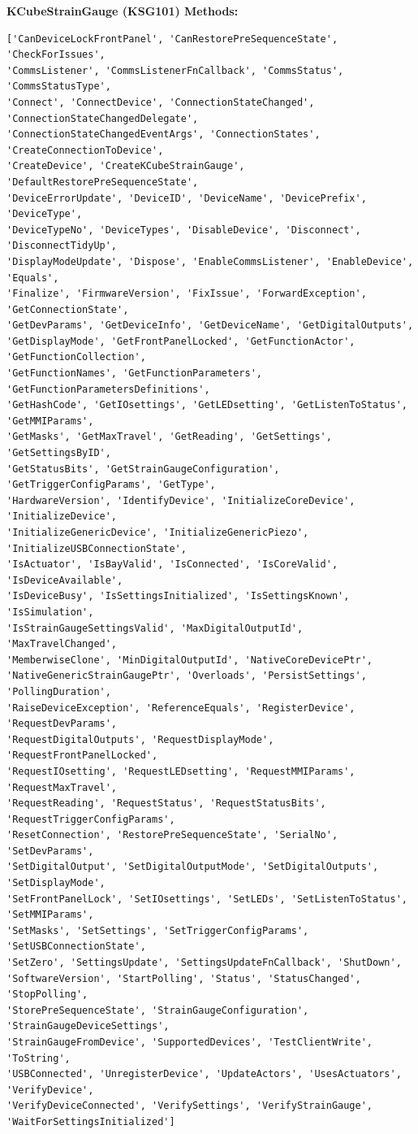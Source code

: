 \documentclass[12pt,a4paper]{article}
\begin{document}
\textbf{KCubeStrainGauge (KSG101) Methods:}
\begin{verbatim}
['CanDeviceLockFrontPanel', 'CanRestorePreSequenceState', 'CheckForIssues', 
'CommsListener', 'CommsListenerFnCallback', 'CommsStatus', 'CommsStatusType', 
'Connect', 'ConnectDevice', 'ConnectionStateChanged', 'ConnectionStateChangedDelegate', 
'ConnectionStateChangedEventArgs', 'ConnectionStates', 'CreateConnectionToDevice', 
'CreateDevice', 'CreateKCubeStrainGauge', 'DefaultRestorePreSequenceState', 
'DeviceErrorUpdate', 'DeviceID', 'DeviceName', 'DevicePrefix', 'DeviceType', 
'DeviceTypeNo', 'DeviceTypes', 'DisableDevice', 'Disconnect', 'DisconnectTidyUp', 
'DisplayModeUpdate', 'Dispose', 'EnableCommsListener', 'EnableDevice', 'Equals', 
'Finalize', 'FirmwareVersion', 'FixIssue', 'ForwardException', 'GetConnectionState', 
'GetDevParams', 'GetDeviceInfo', 'GetDeviceName', 'GetDigitalOutputs', 
'GetDisplayMode', 'GetFrontPanelLocked', 'GetFunctionActor', 'GetFunctionCollection', 
'GetFunctionNames', 'GetFunctionParameters', 'GetFunctionParametersDefinitions', 
'GetHashCode', 'GetIOsettings', 'GetLEDsetting', 'GetListenToStatus', 'GetMMIParams', 
'GetMasks', 'GetMaxTravel', 'GetReading', 'GetSettings', 'GetSettingsByID', 
'GetStatusBits', 'GetStrainGaugeConfiguration', 'GetTriggerConfigParams', 'GetType', 
'HardwareVersion', 'IdentifyDevice', 'InitializeCoreDevice', 'InitializeDevice', 
'InitializeGenericDevice', 'InitializeGenericPiezo', 'InitializeUSBConnectionState', 
'IsActuator', 'IsBayValid', 'IsConnected', 'IsCoreValid', 'IsDeviceAvailable', 
'IsDeviceBusy', 'IsSettingsInitialized', 'IsSettingsKnown', 'IsSimulation', 
'IsStrainGaugeSettingsValid', 'MaxDigitalOutputId', 'MaxTravelChanged', 
'MemberwiseClone', 'MinDigitalOutputId', 'NativeCoreDevicePtr', 
'NativeGenericStrainGaugePtr', 'Overloads', 'PersistSettings', 'PollingDuration', 
'RaiseDeviceException', 'ReferenceEquals', 'RegisterDevice', 'RequestDevParams', 
'RequestDigitalOutputs', 'RequestDisplayMode', 'RequestFrontPanelLocked', 
'RequestIOsetting', 'RequestLEDsetting', 'RequestMMIParams', 'RequestMaxTravel', 
'RequestReading', 'RequestStatus', 'RequestStatusBits', 'RequestTriggerConfigParams', 
'ResetConnection', 'RestorePreSequenceState', 'SerialNo', 'SetDevParams', 
'SetDigitalOutput', 'SetDigitalOutputMode', 'SetDigitalOutputs', 'SetDisplayMode', 
'SetFrontPanelLock', 'SetIOsettings', 'SetLEDs', 'SetListenToStatus', 'SetMMIParams', 
'SetMasks', 'SetSettings', 'SetTriggerConfigParams', 'SetUSBConnectionState', 
'SetZero', 'SettingsUpdate', 'SettingsUpdateFnCallback', 'ShutDown', 
'SoftwareVersion', 'StartPolling', 'Status', 'StatusChanged', 'StopPolling', 
'StorePreSequenceState', 'StrainGaugeConfiguration', 'StrainGaugeDeviceSettings', 
'StrainGaugeFromDevice', 'SupportedDevices', 'TestClientWrite', 'ToString', 
'USBConnected', 'UnregisterDevice', 'UpdateActors', 'UsesActuators', 'VerifyDevice', 
'VerifyDeviceConnected', 'VerifySettings', 'VerifyStrainGauge', 
'WaitForSettingsInitialized']
\end{verbatim}
\end{document}
